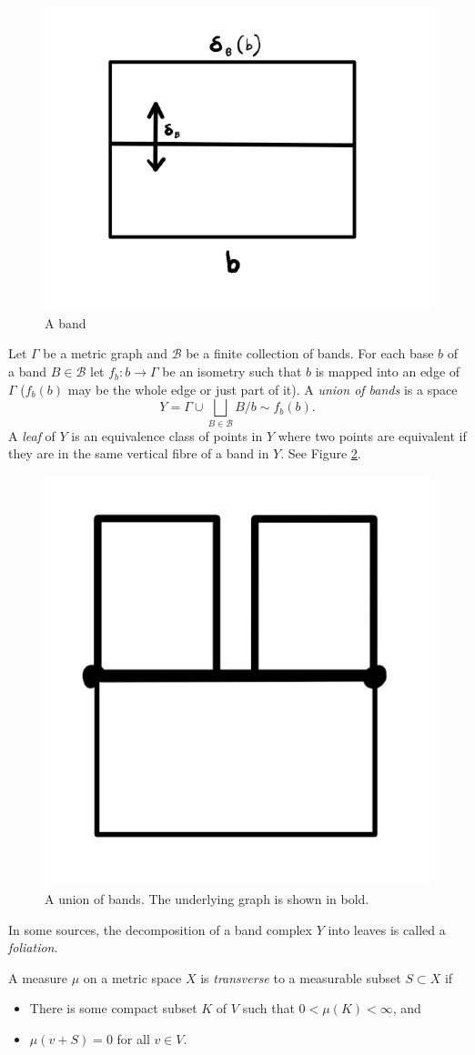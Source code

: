 \begin{figure}[h]
    \centering
    \includegraphics[width=0.5\linewidth]{sections/lorna/Band.png}
    \caption{A band}
    \label{band}
\end{figure}

\begin{definition}
    Let $\Gamma$ be a metric graph and $\mathcal{B}$ be a finite collection of bands. For each base $b$ of a band $B\in \mathcal{B}$ let $f_b:b\rightarrow\Gamma$ be an isometry such that $b$ is mapped into an edge of $\Gamma$ ($f_b(b)$ may be the whole edge or just part of it). A \emph{union of bands} is a space \[Y=\Gamma\cup\underset{B\in\mathcal{B}}{\bigsqcup}B/b \sim f_b(b).\] A \emph{leaf} of $Y$ is an equivalence class of points in $Y$ where two points are equivalent if they are in the same vertical fibre of a band in $Y$. See Figure \ref{unionofbands}.
\end{definition}
\begin{figure}[h]
    \centering
    \includegraphics[width=0.4\linewidth]{sections/lorna/Union of Bands.png}
    \caption{A union of bands. The underlying graph is shown in bold.}
    \label{unionofbands}
\end{figure}

In some sources, the decomposition of a band complex $Y$ into leaves is called a \textit{foliation}.

\begin{definition}
    A measure $\mu$ on a metric space $X$ is \emph{transverse} to a measurable subset $S\subset X$ if 
    \begin{itemize}
        \item There is some compact subset $K$ of $V$ such that $0<\mu(K)<\infty$, and
        \item $\mu(v+S)=0$ for all $v\in V$.
    \end{itemize}
\end{definition}

